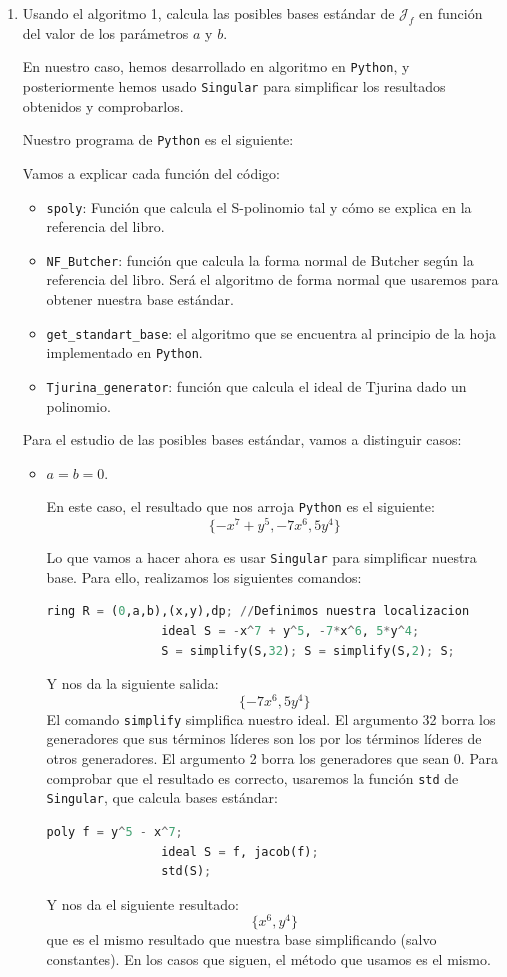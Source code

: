 \documentclass[10pt,a4paper]{article}
\begin{document}
\begin{enumerate}[label=(\alph*)]
	\item Usando el algoritmo 1, calcula las posibles bases estándar de \(\mathcal{J}_f\) en función del valor de los parámetros \(a\) y \(b\).
	
	En nuestro caso, hemos desarrollado en algoritmo en \texttt{Python}, y posteriormente hemos usado \texttt{Singular} para simplificar los resultados obtenidos y comprobarlos. 
	
	Nuestro programa de \texttt{Python} es el siguiente:
	
	
	
	Vamos a explicar cada función del código:
	\begin{itemize}
		\item \texttt{spoly}: Función que calcula el S-polinomio tal y cómo se explica en la referencia del libro.
		\item \texttt{NF\_Butcher}: función que calcula la forma normal de Butcher según la referencia del libro. Será el algoritmo de forma normal que usaremos para obtener nuestra base estándar.
		\item \texttt{get\_standart\_base}: el algoritmo que se encuentra al principio de la hoja implementado en \texttt{Python}.
		\item \texttt{Tjurina\_generator}: función que calcula el ideal de Tjurina dado un polinomio.
	\end{itemize}
	
	Para el estudio de las posibles bases estándar, vamos a distinguir casos:
	\begin{itemize}
		\item \( a=b=0\).
		
		En este caso, el resultado que nos arroja \texttt{Python} es el siguiente:
			\[
				\{ -x^7 + y^5, -7 x^6, 5 y^4 \}
			\]
			
			Lo que vamos a hacer ahora es usar \texttt{Singular} para simplificar nuestra base. Para ello, realizamos los siguientes comandos:
			\begin{lstlisting}[language=Python]
				ring R = (0,a,b),(x,y),dp; //Definimos nuestra localizacion
				ideal S = -x^7 + y^5, -7*x^6, 5*y^4;
				S = simplify(S,32); S = simplify(S,2); S;
			\end{lstlisting}
			Y nos da la siguiente salida:
			\[
				\{-7x^6, 5y^4\}
			\]
			El comando \texttt{simplify} simplifica nuestro ideal. El argumento 32 borra los generadores que sus términos líderes son los por los términos líderes de otros generadores. El argumento 2 borra los generadores que sean 0. Para comprobar que el resultado es correcto, usaremos la función \texttt{std} de \texttt{Singular}, que calcula bases estándar:
			\begin{lstlisting}[language=Python]
				poly f = y^5 - x^7;
				ideal S = f, jacob(f);
				std(S);
			\end{lstlisting}
			Y nos da el siguiente resultado:
			\[
				\{x^6, y^4\}
			\]
			que es el mismo resultado que nuestra base simplificando (salvo constantes). En los casos que siguen, el método que usamos es el mismo.
			

\end{itemize}
\end{enumerate}
\end{document}
